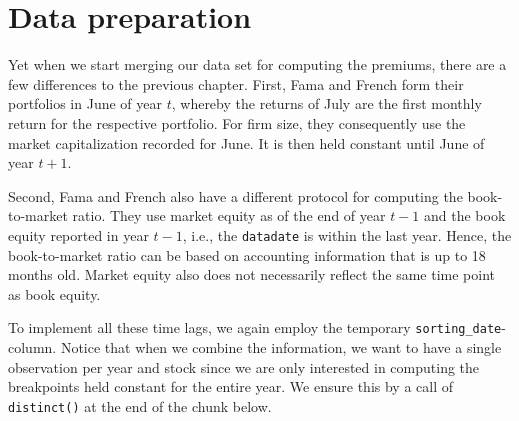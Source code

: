 \documentclass[
]{krantz}
\begin{document}
\hypertarget{data-preparation-3}{%
\section{Data preparation}\label{data-preparation-3}}

Yet when we start merging our data set for computing the premiums, there are a few differences to the previous chapter. First, Fama and French form their portfolios in June of year \(t\), whereby the returns of July are the first monthly return for the respective portfolio. For firm size, they consequently use the market capitalization recorded for June. It is then held constant until June of year \(t+1\).

Second, Fama and French also have a different protocol for computing the book-to-market ratio. They use market equity as of the end of year \(t - 1\) and the book equity reported in year \(t-1\), i.e., the \texttt{datadate} is within the last year. Hence, the book-to-market ratio can be based on accounting information that is up to 18 months old. Market equity also does not necessarily reflect the same time point as book equity.

To implement all these time lags, we again employ the temporary \texttt{sorting\_date}-column. Notice that when we combine the information, we want to have a single observation per year and stock since we are only interested in computing the breakpoints held constant for the entire year. We ensure this by a call of \texttt{distinct()} at the end of the chunk below.
\end{document}
